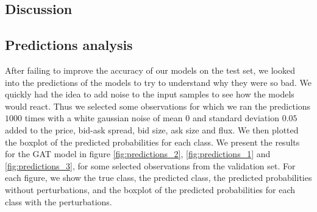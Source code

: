 \documentclass[switch, 11pt]{article}
\begin{document}
\begin{multicols}{2}
    \section{Discussion}

    \subsection{Predictions analysis}

    After failing to improve the accuracy of our models on the test set, we looked into the predictions of the models to try to understand why they were so bad. We quickly had the idea to add noise to the input samples to see how the models would react. Thus we selected some observations for which we ran the predictions $1000$ times with a white gaussian noise of mean $0$ and standard deviation $0.05$ added to the price, bid-ask spread, bid size, ask size and flux. We then plotted the boxplot of the predicted probabilities for each class. We present the results for the GAT model in figure \ref{fig:predictions_2}, \ref{fig:predictions_1} and \ref{fig:predictions_3}, for some selected observations from the validation set. For each figure, we show the true class, the predicted class, the predicted probabilities without perturbations, and the boxplot of the predicted probabilities for each class with the perturbations.


\end{multicols}
\end{document}
